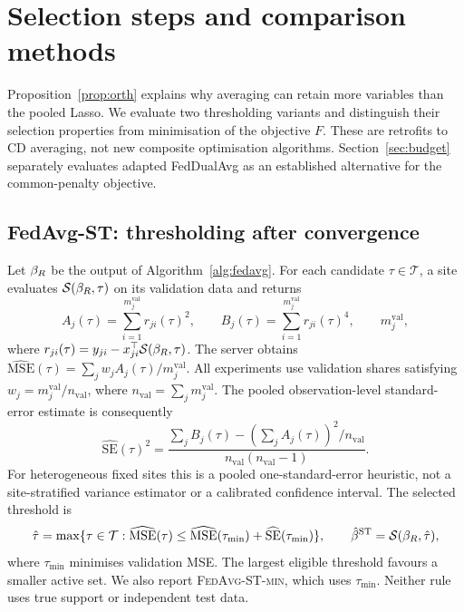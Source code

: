 \section{Selection steps and comparison methods}
\label{sec:method}

Proposition~\ref{prop:orth} explains why averaging can retain more variables
than the pooled Lasso. We evaluate two thresholding variants and distinguish
their selection properties from minimisation of the objective $F$.
These are retrofits to CD averaging, not new composite optimisation
algorithms. Section~\ref{sec:budget} separately evaluates adapted
FedDualAvg as an established alternative for the common-penalty objective.

\subsection{FedAvg-ST: thresholding after convergence}

Let $\beta_R$ be the output of Algorithm~\ref{alg:fedavg}. For each candidate
$\tau\in\mathcal T$, a site evaluates $\mathcal{S}(\beta_R,\tau)$ on its validation
data and returns
\begin{equation}
A_j(\tau)=\sum_{i=1}^{m_j^{\mathrm{val}}}r_{ji}(\tau)^2,\qquad
B_j(\tau)=\sum_{i=1}^{m_j^{\mathrm{val}}}r_{ji}(\tau)^4,\qquad
m_j^{\mathrm{val}},
\label{eq:scalars}
\end{equation}
where $r_{ji}(\tau)=y_{ji}-x_{ji}^{\top}\mathcal{S}(\beta_R,\tau)$.
The server obtains
$\widehat{\mathrm{MSE}}(\tau)=\sum_jw_j A_j(\tau)/m_j^{\mathrm{val}}$.
All experiments use validation shares satisfying
$w_j=m_j^{\mathrm{val}}/n_{\mathrm{val}}$, where
$n_{\mathrm{val}}=\sum_jm_j^{\mathrm{val}}$. The pooled observation-level
standard-error estimate is consequently
\[
\widehat{\mathrm{SE}}(\tau)^2=
\frac{\sum_jB_j(\tau)-(\sum_jA_j(\tau))^2/n_{\mathrm{val}}}
{n_{\mathrm{val}}(n_{\mathrm{val}}-1)}.
\]
For heterogeneous fixed sites this is a pooled one-standard-error heuristic,
not a site-stratified variance estimator or a calibrated confidence interval.
The selected threshold is
\begin{equation}
\hat\tau=\max\{\tau\in\mathcal T:
\widehat{\mathrm{MSE}}(\tau)\leq
\widehat{\mathrm{MSE}}(\tau_{\min})+
\widehat{\mathrm{SE}}(\tau_{\min})\},\qquad
\hat{\beta}^{\mathrm{ST}}=\mathcal{S}(\beta_R,\hat\tau),
\label{eq:st}
\end{equation}
where $\tau_{\min}$ minimises validation MSE. The largest eligible threshold
favours a smaller active set. We also report \textsc{FedAvg-ST-min}, which
uses $\tau_{\min}$. Neither rule uses true support or independent test data.

